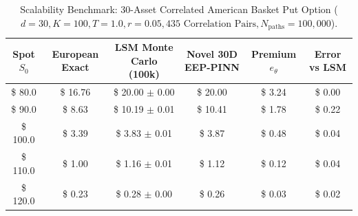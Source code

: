 \begin{table}[h!]
\centering
\small
\caption{Scalability Benchmark: 30-Asset Correlated American Basket Put Option ($d=30, K=100, T=1.0, r=0.05, 435\text{ Correlation Pairs}, N_{\text{paths}}=100,000$).}
\label{tab:scalability_30d_benchmarks}
\begin{tabular}{@{}cccccc@{}}
\toprule
\textbf{Spot $S_0$} & \textbf{European Exact} & \textbf{LSM Monte Carlo (100k)} & \textbf{Novel 30D EEP-PINN} & \textbf{Premium $e_\theta$} & \textbf{Error vs LSM} \\ \midrule
\$ 80.0 & \$ 16.76 & \$ 20.00 $\pm$ 0.00 & \$ 20.00 & \$ 3.24 & \$ 0.00 \\
\$ 90.0 & \$ 8.63 & \$ 10.19 $\pm$ 0.01 & \$ 10.41 & \$ 1.78 & \$ 0.22 \\
\$ 100.0 & \$ 3.39 & \$ 3.83 $\pm$ 0.01 & \$ 3.87 & \$ 0.48 & \$ 0.04 \\
\$ 110.0 & \$ 1.00 & \$ 1.16 $\pm$ 0.01 & \$ 1.12 & \$ 0.12 & \$ 0.04 \\
\$ 120.0 & \$ 0.23 & \$ 0.28 $\pm$ 0.00 & \$ 0.26 & \$ 0.03 & \$ 0.02 \\
\bottomrule
\end{tabular}
\end{table}
